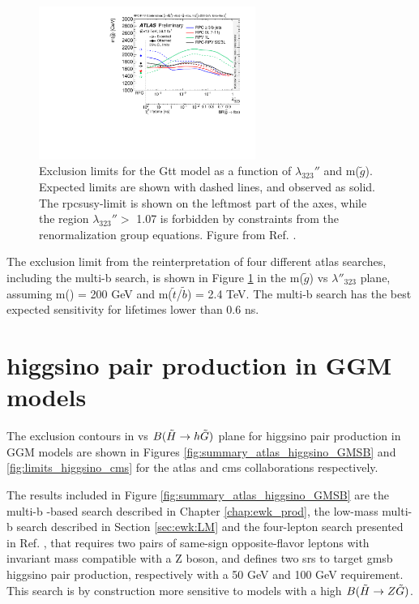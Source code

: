\begin{figure}[htbp]
	\centering
	\includegraphics[width=0.63\textwidth]{figures/rpv/fig_04.pdf}
	\caption{	
	Exclusion limits for the Gtt model as a function of $\lambda_{323}''$ and m($\tilde{g}$). Expected limits are shown with dashed lines, and observed as solid. The \gls{rpcsusy}-limit is shown on the leftmost part of the axes, while the region $\lambda_{323}''>$ 1.07 is forbidden by constraints from the renormalization group equations. Figure from Ref. \cite{ATLAS-CONF-2018-003}.
	} 
	\label{fig:rpv_Gtt}
\end{figure}

The exclusion limit from the reinterpretation of four different \gls{atlas} searches, including the multi-b search, 
is shown in Figure \ref{fig:rpv_Gtt} in the m($\tilde{g}$) vs $\lambda''_{323}$ plane, assuming m(\ninoone) = 200 GeV and  
m($\tilde{t}$/$\tilde{b}$) = 2.4 TeV. 
The multi-b search has the best expected sensitivity 
for \ninoone lifetimes lower than 0.6 ns. 


\FloatBarrier

\section{higgsino pair production in GGM models}

The exclusion contours in \mhino vs $B(\tilde{H}\rightarrow h \tilde{G})$ plane for higgsino pair production in GGM models 
are shown in Figures \ref{fig:summary_atlas_higgsino_GMSB} 
and \ref{fig:limits_higgsino_cms} for the \gls{atlas} and \gls{cms} collaborations respectively.

The results included in Figure \ref{fig:summary_atlas_higgsino_GMSB} are the multi-b \met-based search described in Chapter \ref{chap:ewk_prod},
the low-mass multi-b search described in Section \ref{sec:ewk:LM} and 
the four-lepton search presented in Ref. \cite{Aaboud:2018zeb}, that requires two pairs of same-sign opposite-flavor leptons 
with invariant mass compatible with a Z boson, and defines two \glspl{sr} to target \gls{gmsb} higgsino pair production, respectively 
with a 50 GeV and 100 GeV \met requirement. This search is by construction more sensitive to models with a high $B(\tilde{H}\rightarrow Z \tilde{G})$.

